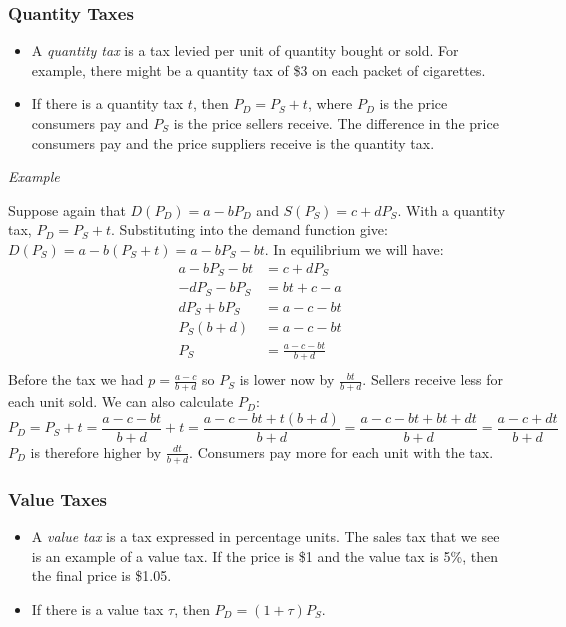 \documentclass{article}
\begin{document}
\subsubsection*{Quantity Taxes}
\begin{itemize}
  \item A \emph{quantity tax} is a tax levied per unit of quantity bought or sold. For example, there might be a quantity tax of \$3 on each packet of cigarettes.
  \item If there is a quantity tax $t$, then $P_D=P_S+t$, where $P_D$ is the price consumers pay and $P_S$ is the price sellers receive. The difference in the price consumers pay and the price suppliers receive is the quantity tax.
\end{itemize}
\emph{Example}\par\noindent
Suppose again that $D\left( P_D \right)=a-bP_D$ and $S\left( P_S \right)=c+dP_S$. With a quantity tax, $P_D=P_S+t$. Substituting into the demand function give: $D\left( P_S \right)=a-b\left(P_S+t  \right)=a-bP_S-bt$. In equilibrium we will have:
\begin{align*}
  a-bP_S-bt&=c+dP_S\\
  -dP_S -bP_S&=bt + c-a\\
  dP_S+ bP_S&=a - c - bt\\
  P_S \left( b+d \right)&=a - c - bt\\
  P_S &=\frac{a-c-bt}{b+d}\\
\end{align*}
Before the tax we had $p=\frac{a-c}{b+d}$ so $P_S$ is lower now by $\frac{bt}{b+d}$. Sellers receive less for each unit sold. We can also calculate $P_D$:
\begin{equation*}
  P_D=P_S+t = \frac{a-c-bt}{b+d} + t = \frac{a-c-bt +t\left( b+d \right)}{b+d}=
  \frac{a-c-bt+bt+dt}{b+d}=\frac{a-c+dt}{b+d}
\end{equation*}
$P_D$ is therefore higher by $\frac{dt}{b+d}$. Consumers pay more for each unit with the tax.
\subsubsection*{Value Taxes}
\begin{itemize}
  \item A \emph{value tax} is a tax expressed in percentage units. The sales tax that we see is an example of a value tax. If the price is \$1 and the value tax is 5\%, then the final price is \$1.05.
  \item If there is a value tax $\tau$, then $P_D=\left( 1+\tau \right)P_S$.
\end{itemize}
\end{document}
